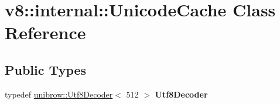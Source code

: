 \hypertarget{classv8_1_1internal_1_1_unicode_cache}{}\section{v8\+:\+:internal\+:\+:Unicode\+Cache Class Reference}
\label{classv8_1_1internal_1_1_unicode_cache}
\subsection*{Public Types}
\begin{DoxyCompactItemize}
\item 
\hypertarget{classv8_1_1internal_1_1_unicode_cache_a23782170a48d31306dacf9ea0596bf05}{}typedef \hyperlink{classunibrow_1_1_utf8_decoder}{unibrow\+::\+Utf8\+Decoder}$<$ 512 $>$ {\bfseries Utf8\+Decoder}\label{classv8_1_1internal_1_1_unicode_cache_a23782170a48d31306dacf9ea0596bf05}

\end{DoxyCompactItemize}
